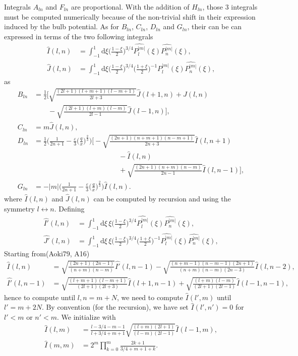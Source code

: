 \documentclass[11pt]{article}
\newcommand{\rd}{\mathrm{d}}
\newcommand{\Pnm}{P_n^{|m|}}
\newcommand{\Plm}{P_l^{|m|}}
\newcommand{\hPnm}{\widehat{\Pnm}}
\newcommand{\hPlm}{\widehat{\Plm}}
\newcommand{\hI}{\widehat{I}}
\newcommand{\hJ}{\widehat{J}}
\newcommand{\hIp}{\widehat{I'}}
\newcommand{\hJp}{\widehat{J'}}
\begin{document}
Integrals $A_{ln}$ and  $F_{ln}$ are proportional. With the addition of $H_{ln}$, those 3 integrals must be computed numerically because of the non-trivial shift in their expression induced by the bulb potential. As for $B_{ln}$, $C_{ln}$, $D_{ln}$ and $G_{ln}$, their can be can expressed in terms of the two following integrals 
\begin{align}
\hI(l,n) &= \int_{-1}^{1} \rd \xi  \bigg(\frac{1-\xi}{2}\bigg)^{3/4} \hPlm(\xi)  \hPnm(\xi), \\
\hJ(l,n) &= \int_{-1}^{1} \rd \xi  \bigg(\frac{1-\xi}{2}\bigg)^{3/4}  \bigg(\frac{1+\xi}{2}\bigg)^{-1}\hPlm(\xi)  \hPnm(\xi) ,
\end{align}
as
\begin{align*}
B_{ln} &= \frac{1}{2} \bigg[ \sqrt{\frac{(2l+1)(l+m+1)(l-m+1)}{2l+3}} \hJ(l+1,n)+ \hJ(l,n)\\
&\quad \quad  -\sqrt{\frac{(2l+1)(l+m)(l-m)}{2l-1}} \hJ(l-1,n)\bigg] ,\\
C_{ln} &= m \hJ(l,n) ,\\
D_{ln} &= \frac{1}{2}  \bigg(\frac{1}{2n+1}-\frac{\varepsilon}{3}  \bigg(\frac{q}{x}\bigg)^{\frac{2}{3}} \bigg)
\bigg[ -\sqrt{\frac{(2n+1)(n+m+1)(n-m+1)}{2n+3}} \hI(l,n+1) \\
&\quad \quad \quad \quad \quad \quad\quad \quad\quad \quad \quad \quad- \hI(l,n) \\
&\quad \quad \quad \quad \quad \quad\quad \quad\quad \quad \quad \quad  +\sqrt{\frac{(2n+1)(n+m)(n-m)}{2n-1}} \hI(l,n-1)\bigg] ,\\
G_{ln} &= -|m| \bigg(\frac{1}{2n+1}-\frac{\varepsilon}{3}  \bigg(\frac{q}{x}\bigg)^{\frac{2}{3}} \bigg)  \hI(l,n) .
\end{align*}
where $\hI(l,n)$ and $\hJ(l,n)$ can be computed by recursion and using the symmetry $l\leftrightarrow n$. Defining
\begin{align}
\hIp(l,n) &= \int_{-1}^{1} \rd \xi \, \xi \bigg(\frac{1-\xi}{2}\bigg)^{3/4} \hPlm(\xi)  \hPnm(\xi), \\
\hJp(l,n) &= \int_{-1}^{1} \rd \xi \, \xi \bigg(\frac{1-\xi}{2}\bigg)^{3/4}  \bigg(\frac{1+\xi}{2}\bigg)^{-1}\hPlm(\xi)  \hPnm(\xi) ,
\end{align}
Starting from(Aoki79, A16)
\begin{align*}
\hI(l,n) &= \sqrt{\frac{(2n+1)(2n-1)}{(n+m)(n-m)}} \hIp(l,n-1)-\sqrt{\frac{(n+m-1)(n-m-1)(2n+1)}{(n+m)(n-m)(2n-3)}} \hI(l,n-2) ,\\
\hIp(l,n-1) &= \sqrt{\frac{(l+m+1)(l-m+1)}{(2l+1)(2l+3)}} \hI(l+1,n-1)+\sqrt{\frac{(l+m)(l-m)}{(2l+1)(2l-1)}} \hI(l-1,n-1) ,
\end{align*}
hence to compute until $l,n=m+N$, we need to compute $\hI(l',m)$ until $l'=m+2N$. By convention (for the recursion), we have set $\hI(l',n')=0$ for $l'<m$ or  $n'<m$.
We initialize with
\begin{align*}
\hI(l,m) &= \frac{l-3/4-m-1}{l+3/4+m+1} \sqrt{\frac{(l+m)(2l+1)}{(l-m)(2l-1)}} \hI(l-1,m) ,\\
\hI(m,m) &= 2^m \prod_{k=0}^{m} \frac{2k+1}{3/4 + m + 1 + k} .
\end{align*}
\end{document}
